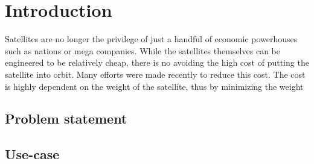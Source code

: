 \chapter{Introduction}\label{chap:Introduction}

Satellites are no longer the privilege of just a handful of economic powerhouses such as nations or mega companies. While the satellites themselves can be engineered to be relatively cheap, there is no avoiding the high cost of putting the satellite into orbit. Many efforts were made recently to reduce this cost. The cost is highly dependent on the weight of the satellite, thus by minimizing the weight 

\section{Problem statement}


\section{Use-case}\label{sec:useCase}


